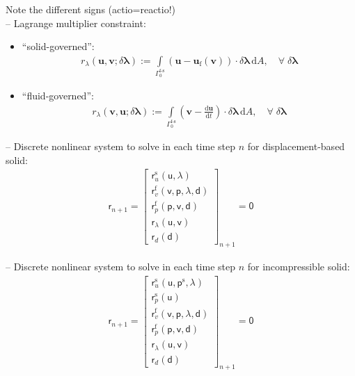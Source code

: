 \documentclass[a4paper,12pt]{report}
\newcommand{\fS}{\text{s}}
\newcommand{\fF}{\text{f}}
\newcommand{\bs}[1]{\boldsymbol{#1}}
\newcommand{\Gm}{\mathit{\Gamma}}
\newcommand{\ROP}{\bs{\mathsf{r}}}
\newcommand{\LM}{\bs{\mathsf{\lambda}}}
\begin{document}
Note the different signs (actio=reactio!)\\

-- Lagrange multiplier constraint:

\begin{itemize}

\item ``solid-governed'':
\begin{align}
r_{\lambda}(\bs{u},\bs{v};\delta\bs{\lambda}):= \int\limits_{\Gm_0^{\mathrm{\fF\text{-}\fS}}} \left(\bs{u} - \bs{u}_{\mathrm{f}}(\bs{v})\right)\cdot\delta\bs{\lambda}\,\mathrm{d}A, \quad \forall \; \delta\bs{\lambda}
\end{align}

\item ``fluid-governed'':
\begin{align}
r_{\lambda}(\bs{v},\bs{u};\delta\bs{\lambda}):= \int\limits_{\Gm_0^{\mathrm{\fF\text{-}\fS}}} \left(\bs{v} - \frac{\mathrm{d} \bs{u}}{\mathrm{d} t}\right)\cdot\delta\bs{\lambda}\,\mathrm{d}A, \quad \forall \; \delta\bs{\lambda}
\end{align}

\end{itemize}


-- Discrete nonlinear system to solve in each time step $n$ for displacement-based solid:
\begin{align}
\ROP_{n+1} = \begin{bmatrix} \ROP_{u}^{\mathrm{s}}(\bs{\mathsf{u}},\LM) \\ \ROP_{v}^{\mathrm{f}}(\bs{\mathsf{v}},\bs{\mathsf{p}},\LM,\bs{\mathsf{d}}) \\ \ROP_{p}^{\mathrm{f}}(\bs{\mathsf{p}},\bs{\mathsf{v}},\bs{\mathsf{d}}) \\ \ROP_{\lambda}(\bs{\mathsf{u}},\bs{\mathsf{v}}) \\ \ROP_{d}(\bs{\mathsf{d}}) \end{bmatrix}_{n+1} = \bs{\mathsf{0}}\label{eq:nonlin_sys_fsi}
\end{align}

-- Discrete nonlinear system to solve in each time step $n$ for incompressible solid:
\begin{align}
\ROP_{n+1} = \begin{bmatrix} \ROP_{u}^{\mathrm{s}}(\bs{\mathsf{u}},\bs{\mathsf{p}}^{\mathrm{s}},\LM) \\ \ROP_{p}^{\mathrm{s}}(\bs{\mathsf{u}}) \\ \ROP_{v}^{\mathrm{f}}(\bs{\mathsf{v}},\bs{\mathsf{p}},\LM,\bs{\mathsf{d}}) \\ \ROP_{p}^{\mathrm{f}}(\bs{\mathsf{p}},\bs{\mathsf{v}},\bs{\mathsf{d}}) \\ \ROP_{\lambda}(\bs{\mathsf{u}},\bs{\mathsf{v}}) \\ \ROP_{d}(\bs{\mathsf{d}}) \end{bmatrix}_{n+1} = \bs{\mathsf{0}}\label{eq:nonlin_sys_fsi_inc}
\end{align}
\end{document}

